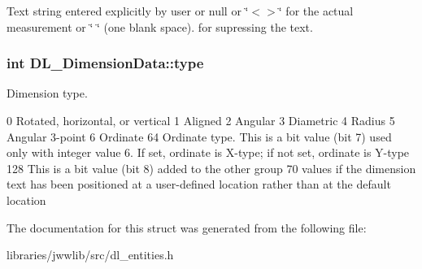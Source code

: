 Text string entered explicitly by user or null or \char`\"{}$<$$>$\char`\"{} for the actual measurement or \char`\"{} \char`\"{} (one blank space). for supressing the text. \hypertarget{structDL__DimensionData_afd0fc072454a42bb06922cf96db6512b}{
\subsubsection[{type}]{\setlength{\rightskip}{0pt plus 5cm}int D\-L\-\_\-\-Dimension\-Data\-::type}}\label{structDL__DimensionData_afd0fc072454a42bb06922cf96db6512b}
Dimension type.

0 Rotated, horizontal, or vertical 1 Aligned 2 Angular 3 Diametric 4 Radius 5 Angular 3-\/point 6 Ordinate 64 Ordinate type. This is a bit value (bit 7) used only with integer value 6. If set, ordinate is X-\/type; if not set, ordinate is Y-\/type 128 This is a bit value (bit 8) added to the other group 70 values if the dimension text has been positioned at a user-\/defined location rather than at the default location 

The documentation for this struct was generated from the following file\-:\begin{DoxyCompactItemize}
\item 
libraries/jwwlib/src/dl\-\_\-entities.\-h\end{DoxyCompactItemize}
